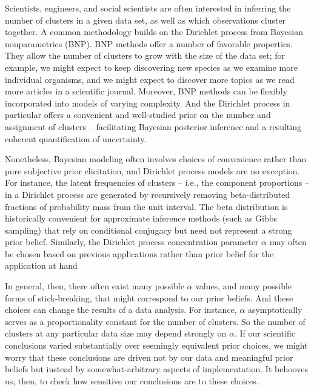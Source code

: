 Scientists, engineers, and social scientists are often interested in inferring
the number of clusters in a given data set, as well as which observations
cluster together. A common methodology builds on the Dirichlet process
\citep{ferguson:1973:bayesian, sethuraman:1994:constructivedp} from Bayesian
nonparametrics (BNP). BNP methods offer a number of favorable properties. They
allow the number of clusters to grow with the size of the data set; for example,
we might expect to keep discovering new species as we examine more individual
organisms, and we might expect to discover more topics as we read more articles
in a scientific journal. Moreover, BNP methods can be flexibly incorporated into
models of varying complexity. And the Dirichlet process in particular offers a
convenient and well-studied prior on the number and assignment of clusters --
facilitating Bayesian posterior inference and a resulting coherent
quantification of uncertainty.

Nonetheless, Bayesian modeling often involves choices of convenience rather than
pure subjective prior elicitation, and Dirichlet process models are no
exception. For instance, the latent frequencies of clusters -- i.e., the
component proportions -- in a Dirichlet process are generated by recursively
removing beta-distributed fractions of probability mass from the unit interval.
The beta distribution is historically convenient for approximate inference
methods (such as Gibbs sampling) that rely on conditional conjugacy but need not
represent a strong prior belief. Similarly, the Dirichlet process concentration
parameter $\alpha$ may often be chosen based on previous applications rather
than prior belief for the application at hand
\citep[Chapter 23]{gelman:2013:bda}

In general, then, there often exist many possible $\alpha$ values, and many
possible forms of stick-breaking, that might correspond to our prior beliefs.
And these choices can change the results of a data analysis. For instance,
$\alpha$ asymptotically serves as a proportionality constant for the number of
clusters. So the number of clusters at any particular data size may depend
strongly on $\alpha$. If our scientific conclusions varied substantially over
seemingly equivalent prior choices, we might worry that these conclusions are
driven not by our data and meaningful prior beliefs but instead by
somewhat-arbitrary aspects of implementation. It behooves us, then, to check how
sensitive our conclusions are to these choices.

